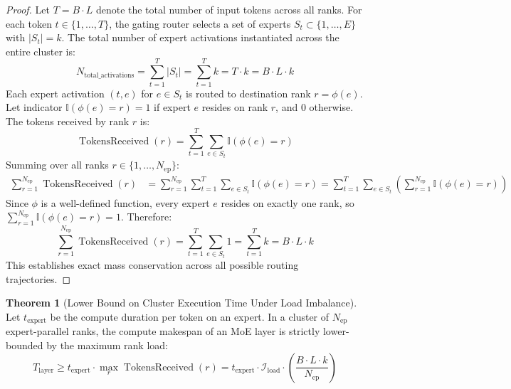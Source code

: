 \documentclass[11pt,a4paper]{article}
\theoremstyle{definition}
\newtheorem{theorem}{\textbf{Theorem}}[section]
\begin{document}
\begin{proof}
Let $T = B \cdot L$ denote the total number of input tokens across all ranks.
For each token $t \in \{1, \dots, T\}$, the gating router selects a set of experts $S_t \subset \{1, \dots, E\}$ with $|S_t| = k$.
The total number of expert activations instantiated across the entire cluster is:
{\boldmath
\begin{equation}
N_{\text{total\_activations}} = \sum_{t=1}^T |S_t| = \sum_{t=1}^T k = T \cdot k = B \cdot L \cdot k
\end{equation}
}
Each expert activation $(t, e)$ for $e \in S_t$ is routed to destination rank $r = \phi(e)$.
Let indicator $\mathbb{I}(\phi(e) = r) = 1$ if expert $e$ resides on rank $r$, and $0$ otherwise.
The tokens received by rank $r$ is:
{\boldmath
\begin{equation}
\operatorname{TokensReceived}(r) = \sum_{t=1}^T \sum_{e \in S_t} \mathbb{I}(\phi(e) = r)
\end{equation}
}
Summing over all ranks $r \in \{1, \dots, N_{\text{ep}}\}$:
{\boldmath
\begin{align}
\sum_{r=1}^{N_{\text{ep}}} \operatorname{TokensReceived}(r) &= \sum_{r=1}^{N_{\text{ep}}} \sum_{t=1}^T \sum_{e \in S_t} \mathbb{I}(\phi(e) = r) = \sum_{t=1}^T \sum_{e \in S_t} \left( \sum_{r=1}^{N_{\text{ep}}} \mathbb{I}(\phi(e) = r) \right)
\end{align}
}
Since $\phi$ is a well-defined function, every expert $e$ resides on exactly one rank, so $\sum_{r=1}^{N_{\text{ep}}} \mathbb{I}(\phi(e) = r) = 1$.
Therefore:
{\boldmath
\begin{equation}
\sum_{r=1}^{N_{\text{ep}}} \operatorname{TokensReceived}(r) = \sum_{t=1}^T \sum_{e \in S_t} 1 = \sum_{t=1}^T k = B \cdot L \cdot k
\end{equation}
}
This establishes exact mass conservation across all possible routing trajectories.
\end{proof}

\begin{theorem}[Lower Bound on Cluster Execution Time Under Load Imbalance]
Let $t_{\text{expert}}$ be the compute duration per token on an expert. In a cluster of $N_{\text{ep}}$ expert-parallel ranks, the compute makespan of an MoE layer is strictly lower-bounded by the maximum rank load:
{\boldmath
\begin{equation}
T_{\text{layer}} \ge t_{\text{expert}} \cdot \max_{r} \operatorname{TokensReceived}(r) = t_{\text{expert}} \cdot \mathcal{I}_{\text{load}} \cdot \left( \frac{B \cdot L \cdot k}{N_{\text{ep}}} \right)
\end{equation}
}
\end{theorem}
\end{document}
